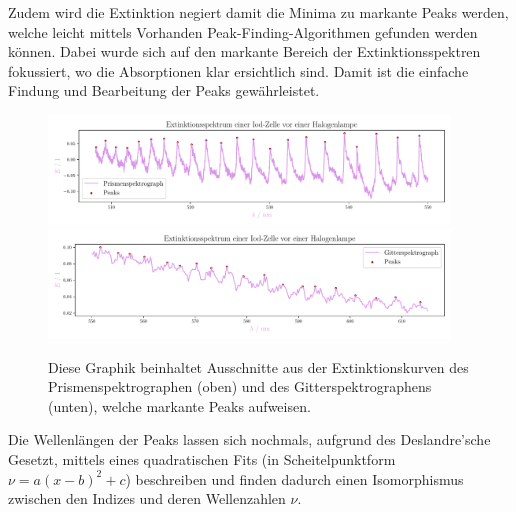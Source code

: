\documentclass[12pt,english,ngerman]{scrartcl}
\begin{document}
Zudem wird die Extinktion negiert damit die Minima zu markante Peaks werden,
welche leicht mittels Vorhanden Peak-Finding-Algorithmen gefunden werden
können. Dabei wurde sich auf den markante Bereich der Extinktionsspektren
fokussiert, wo die Absorptionen klar ersichtlich sind. Damit ist die einfache
Findung und Bearbeitung der Peaks gewährleistet.

\begin{figure}[H]
	\begin{center}
		\includegraphics[width=0.95\textwidth]{figures/prism_ausschnitt_extinction.pdf}
		\includegraphics[width=0.95\textwidth]{figures/gitter_ausschnitt_extinction.pdf}
	\end{center}
	\caption{Diese Graphik beinhaltet Ausschnitte aus der Extinktionskurven
		des Prismenspektrographen (oben) und des Gitterspektrographens 
		(unten), welche markante Peaks aufweisen.
	}\label{fig:ausschnittPeaks}
\end{figure}

Die Wellenlängen der Peaks lassen sich nochmals, aufgrund des Deslandre'sche
Gesetzt, mittels eines quadratischen Fits (in Scheitelpunktform $\nu = a
	(x-b)^2 + c$) beschreiben und finden dadurch einen Isomorphismus zwischen den
Indizes und deren Wellenzahlen $\nu$.
\end{document}
